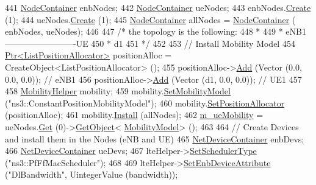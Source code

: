 \begin{DoxyCode}
441   \hyperlink{classns3_1_1NodeContainer}{NodeContainer} enbNodes;
442   \hyperlink{classns3_1_1NodeContainer}{NodeContainer} ueNodes;
443   enbNodes.\hyperlink{classns3_1_1NodeContainer_a787f059e2813e8b951cc6914d11dfe69}{Create} (1);
444   ueNodes.\hyperlink{classns3_1_1NodeContainer_a787f059e2813e8b951cc6914d11dfe69}{Create} (1);
445   \hyperlink{classns3_1_1NodeContainer}{NodeContainer} allNodes = \hyperlink{classns3_1_1NodeContainer}{NodeContainer} ( enbNodes, ueNodes);
446 
447 \textcolor{comment}{/*   the topology is the following:}
448 \textcolor{comment}{ *}
449 \textcolor{comment}{ *   eNB1-------------------------UE}
450 \textcolor{comment}{ *                  d1}
451 \textcolor{comment}{ */}
452 
453   \textcolor{comment}{// Install Mobility Model}
454   \hyperlink{classns3_1_1Ptr}{Ptr<ListPositionAllocator>} positionAlloc = CreateObject<ListPositionAllocator> 
      ();
455   positionAlloc->\hyperlink{classns3_1_1ListPositionAllocator_a460e82f015ac012a73ba0ea0cccb3486}{Add} (Vector (0.0, 0.0, 0.0));                  \textcolor{comment}{// eNB1}
456   positionAlloc->\hyperlink{classns3_1_1ListPositionAllocator_a460e82f015ac012a73ba0ea0cccb3486}{Add} (Vector (d1, 0.0, 0.0));           \textcolor{comment}{// UE1}
457 
458   \hyperlink{classns3_1_1MobilityHelper}{MobilityHelper} mobility;
459   mobility.\hyperlink{classns3_1_1MobilityHelper_a030275011b6f40682e70534d30280aba}{SetMobilityModel} (\textcolor{stringliteral}{"ns3::ConstantPositionMobilityModel"});
460   mobility.\hyperlink{classns3_1_1MobilityHelper_ac59d5295076be3cc11021566713a28c5}{SetPositionAllocator} (positionAlloc);
461   mobility.\hyperlink{classns3_1_1MobilityHelper_a07737960ee95c0777109cf2994dd97ae}{Install} (allNodes);
462   \hyperlink{classLteUplinkPowerControlTestCase_a0b8bf35679af00783442c2e310b30e45}{m\_ueMobility} = ueNodes.\hyperlink{classns3_1_1NodeContainer_a9ed96e2ecc22e0f5a3d4842eb9bf90bf}{Get} (0)->\hyperlink{classns3_1_1Object_a13e18c00017096c8381eb651d5bd0783}{GetObject}<
      \hyperlink{classns3_1_1MobilityModel}{MobilityModel}> ();
463 
464   \textcolor{comment}{// Create Devices and install them in the Nodes (eNB and UE)}
465   \hyperlink{classns3_1_1NetDeviceContainer}{NetDeviceContainer} enbDevs;
466   \hyperlink{classns3_1_1NetDeviceContainer}{NetDeviceContainer} ueDevs;
467   lteHelper->\hyperlink{classns3_1_1LteHelper_a8f86e55b8b80a81732c4b2df00fb25d5}{SetSchedulerType} (\textcolor{stringliteral}{"ns3::PfFfMacScheduler"});
468 
469   lteHelper->\hyperlink{classns3_1_1LteHelper_ac42f0f3d6cd8473d810bfbbeb5d592e0}{SetEnbDeviceAttribute} (\textcolor{stringliteral}{"DlBandwidth"}, UintegerValue (bandwidth));

\end{DoxyCode}
